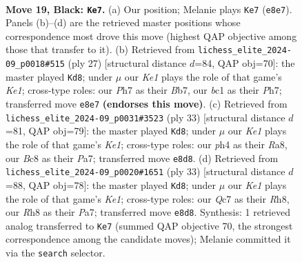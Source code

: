 \documentclass[11pt]{article}
\begin{document}
\clearpage

\begin{figure}[p]\centering
\begin{subfigure}{0.46\textwidth}\centering
\resizebox{\linewidth}{!}{%
\newchessgame
\chessboard[
  setfen={r1b1kb1r/2q3pp/1p6/pQ2p3/3p3P/8/PP3PP1/RNB1R1K1 b q - 1 19},
  showmover=false,
  pgfstyle=straightmove, color=movearrow, markmove={e8-e7}
]}
\caption{}
\end{subfigure}\hfill
\begin{subfigure}{0.46\textwidth}\centering
\resizebox{\linewidth}{!}{%
\newchessgame
\chessboard[
  setfen={r3kb1r/pb1p3p/1qp1pp2/7Q/5P2/PP6/2P3PP/R1B1KB1R b KQkq - 2 14},
  showmover=false,
  pgfstyle=straightmove, color=movearrow, markmove={e8-d8}
]}
\caption{}
\end{subfigure}
\\[4pt]
\begin{subfigure}{0.46\textwidth}\centering
\resizebox{\linewidth}{!}{%
\newchessgame
\chessboard[
  setfen={r3kb1r/p5pp/qpp1p3/3p3Q/8/8/P2B1PPP/R4RK1 b kq - 1 17},
  showmover=false,
  pgfstyle=straightmove, color=movearrow, markmove={e8-d8}
]}
\caption{}
\end{subfigure}\hfill
\begin{subfigure}{0.46\textwidth}\centering
\resizebox{\linewidth}{!}{%
\newchessgame
\chessboard[
  setfen={r1b1kb1r/ppp3pp/2q5/7Q/8/1P4R1/PB3P1P/RN2K3 b Qkq - 1 17},
  showmover=false,
  pgfstyle=straightmove, color=movearrow, markmove={e8-d8}
]}
\caption{}
\end{subfigure}
\caption{\textbf{Move 19, Black: \texttt{Ke7}.} (a) Our position; Melanie plays \texttt{Ke7} (\texttt{e8e7}). Panels (b)--(d) are the retrieved master positions whose correspondence most drove this move (highest QAP objective among those that transfer to it). (b) Retrieved from \texttt{lichess\_elite\_2024-09\_p0018\#515} (ply 27) [structural distance $d$=84, QAP obj=70]: the master played \texttt{Kd8}; under $\mu$ our \emph{Ke1} plays the role of that game's \emph{Ke1}; cross-type roles: our \emph{P}h7 as their \emph{B}b7, our \emph{b}c1 as their \emph{P}h7; transferred move \texttt{e8e7} \textbf{(endorses this move)}. (c) Retrieved from \texttt{lichess\_elite\_2024-09\_p0031\#3523} (ply 33) [structural distance $d$=81, QAP obj=79]: the master played \texttt{Kd8}; under $\mu$ our \emph{Ke1} plays the role of that game's \emph{Ke1}; cross-type roles: our \emph{p}h4 as their \emph{R}a8, our \emph{B}c8 as their \emph{P}a7; transferred move \texttt{e8d8}. (d) Retrieved from \texttt{lichess\_elite\_2024-09\_p0020\#1651} (ply 33) [structural distance $d$=88, QAP obj=78]: the master played \texttt{Kd8}; under $\mu$ our \emph{Ke1} plays the role of that game's \emph{Ke1}; cross-type roles: our \emph{Q}c7 as their \emph{R}h8, our \emph{R}h8 as their \emph{P}a7; transferred move \texttt{e8d8}. Synthesis: 1 retrieved analog transferred to \texttt{Ke7} (summed QAP objective 70, the strongest correspondence among the candidate moves); Melanie committed it via the \texttt{search} selector.}
\label{fig:thought-m37}
\end{figure}
\end{document}
